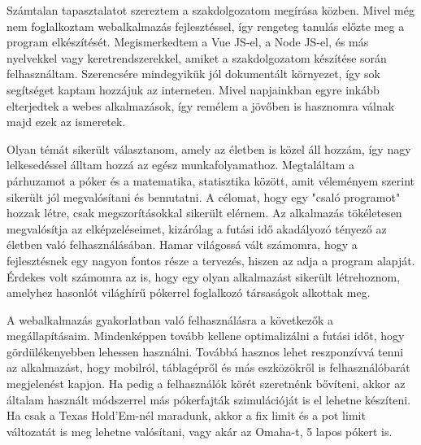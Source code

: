 Számtalan tapasztalatot szereztem a szakdolgozatom megírása közben. Mivel még nem foglalkoztam webalkalmazás fejlesztéssel, így rengeteg tanulás előzte meg a program elkészítését. Megismerkedtem a Vue JS-el, a Node JS-el, és más nyelvekkel vagy keretrendszerekkel, amiket a szakdolgozatom készítése során felhasználtam. Szerencsére mindegyikük jól dokumentált környezet, így sok segítséget kaptam hozzájuk az interneten. Mivel napjainkban egyre inkább elterjedtek a webes alkalmazások, így remélem a jövőben is hasznomra válnak majd ezek az ismeretek.

Olyan témát sikerült választanom, amely az életben is közel áll hozzám, így nagy lelkesedéssel álltam hozzá az egész munkafolyamathoz. Megtaláltam a párhuzamot a póker és a matematika, statisztika között, amit véleményem szerint sikerült jól megvalósítani és bemutatni. A célomat, hogy egy "csaló programot" hozzak létre, csak megszorításokkal sikerült elérnem. Az alkalmazás tökéletesen megvalósítja az elképzeléseimet, kizárólag a futási idő akadályozó tényező az életben való felhasználásában. Hamar világossá vált számomra, hogy a fejlesztésnek egy nagyon fontos része a tervezés, hiszen az adja a program alapját. Érdekes volt számomra az is, hogy egy olyan alkalmazást sikerült létrehoznom, amelyhez hasonlót világhírű pókerrel foglalkozó társaságok alkottak meg.

A webalkalmazás gyakorlatban való felhasználásra a következők a megállapításaim. Mindenképpen tovább kellene optimalizálni a futási időt, hogy gördülékenyebben lehessen használni. Továbbá hasznos lehet reszponzívvá tenni az alkalmazást, hogy mobilról, táblagépről és más eszközökről is felhasználóbarát megjelenést kapjon. Ha pedig a felhasználók körét szeretnénk bővíteni, akkor az általam használt módszerrel más pókerfajták szimulációját is el lehetne készíteni. Ha csak a Texas Hold'Em-nél maradunk, akkor a fix limit és a pot limit változatát is meg lehetne valósítani, vagy akár az Omaha-t, 5 lapos pókert is.